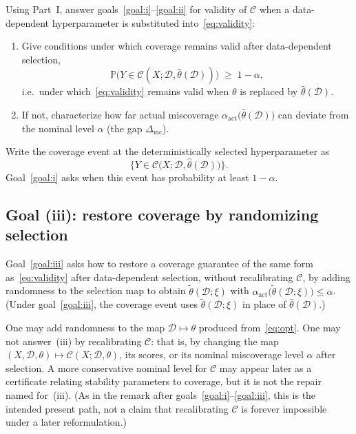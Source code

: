 \documentclass[12pt]{article}
\theoremstyle{plain}
\begin{document}
\label{prob:part-ii}
Using Part~I, answer goals~\ref{goal:i}--\ref{goal:ii} for validity of $\mathcal{C}$ when a data-dependent hyperparameter is substituted into~\eqref{eq:validity}:
\begin{enumerate}[leftmargin=*]
  \item[(i)]
        Give conditions under which coverage remains valid after data-dependent selection,
        \[
        \mathbb{P}\bigl(Y\in\mathcal{C}(X;\mathcal{D},\hat\theta(\mathcal{D}))\bigr)
        \;\ge\;
        1-\alpha,
        \]
        i.e.\ under which~\eqref{eq:validity} remains valid when $\theta$ is replaced by $\hat\theta(\mathcal{D})$.
  \item[(ii)]
        If not, characterize how far actual miscoverage $\alpha_{\mathrm{act}}\bigl(\hat\theta(\mathcal{D})\bigr)$ can deviate from the nominal level $\alpha$ (the gap $\Delta_{\mathrm{mc}}$).
\end{enumerate}

\label{def:plugin}
Write the coverage event at the deterministically selected hyperparameter as
\[
\bigl\{ Y\in\mathcal{C}\bigl(X;\mathcal{D},\hat\theta(\mathcal{D})\bigr) \bigr\}.
\]
Goal~\ref{goal:i} asks when this event has probability at least $1-\alpha$.

\subsection{Goal (iii): restore coverage by randomizing selection}
\label{sec:part-ii-c}

Goal~\ref{goal:iii} asks how to restore a coverage guarantee of the same form as~\eqref{eq:validity} after data-dependent selection,
without recalibrating $\mathcal{C}$,
by adding randomness to the selection map to obtain $\widetilde\theta(\mathcal{D};\xi)$
with $\alpha_{\mathrm{act}}\bigl(\widetilde\theta(\mathcal{D};\xi)\bigr)\le\alpha$.
(Under goal~\ref{goal:iii}, the coverage event uses $\widetilde\theta(\mathcal{D};\xi)$ in place of $\hat\theta(\mathcal{D})$.)

\label{rem:part-ii-ceiling}
One may add randomness to the map $\mathcal{D}\mapsto\theta$ produced from~\eqref{eq:opt}.
One may not answer~(iii) by recalibrating $\mathcal{C}$: that is, by changing the map $(X,\mathcal{D},\theta)\mapsto\mathcal{C}(X;\mathcal{D},\theta)$, its scores, or its nominal miscoverage level $\alpha$ after selection.
A more conservative nominal level for $\mathcal{C}$ may appear later as a certificate relating stability parameters to coverage, but it is not the repair named for~(iii).
(As in the remark after goals~\ref{goal:i}--\ref{goal:iii}, this is the intended present path, not a claim that recalibrating $\mathcal{C}$ is forever impossible under a later reformulation.)
\end{document}
